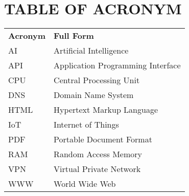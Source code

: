 \chapter*{\centering TABLE OF ACRONYM}
\begin{tabular}{ll}
	\textbf{Acronym} & \textbf{Full Form} \\
	AI & Artificial Intelligence \\
	API & Application Programming Interface \\
	CPU & Central Processing Unit \\
	DNS & Domain Name System \\
	HTML & Hypertext Markup Language \\
	IoT & Internet of Things \\
	PDF & Portable Document Format \\
	RAM & Random Access Memory \\
	VPN & Virtual Private Network \\
	WWW & World Wide Web \\
\end{tabular}
